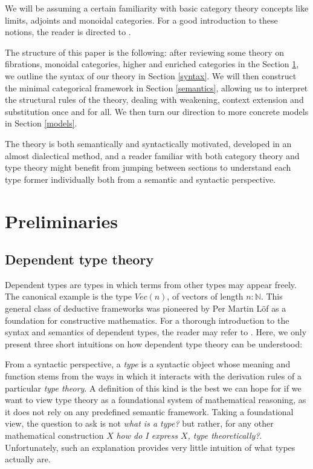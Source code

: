 We will be assuming a certain familiarity with basic category theory concepts like limits, adjoints and monoidal categories. For a good introduction to these notions, the reader is directed to \cite{awodey2010category}.

The structure of this paper is the following: after reviewing some theory on fibrations, monoidal categories, higher and enriched categories in the Section \ref{prelim}, we outline the syntax of our theory in Section \ref{syntax}. We will then construct the minimal categorical framework in Section \ref{semantics}, allowing us to interpret the structural rules of the theory, dealing with weakening, context extension and substitution once and for all. We then turn our direction to more concrete models in Section \ref{models}.

The theory is both semantically and syntactically motivated, developed in an almost dialectical method, and a reader familiar with both category theory and type theory might benefit from jumping between sections to understand each type former individually both from a semantic and syntactic perspective.
\section{Preliminaries}\label{prelim}
\subsection{Dependent type theory}
Dependent types are types in which terms from other types may appear freely. The canonical example is the type $Vec(n)$, of vectors of length $n : \mathbb{N}$. This general class of deductive frameworks was pioneered by Per Martin Löf \cite{martin1984intuitionistic} as a foundation for constructive mathematics. For a thorough introduction to the syntax and semantics of dependent types, the reader may refer to \cite{hofmann1997syntax}. Here, we only present three short intuitions on how dependent type theory can be understood:

From a syntactic perspective, a \textit{type} is a syntactic object whose meaning and function stems from the ways in which it interacts with the derivation rules of a particular \textit{type theory}. A definition of this kind is the best we can hope for if we want to view type theory as a foundational system of mathematical reasoning, as it does not rely on any predefined semantic framework. Taking a foundational view, the question to ask is not \textit{what is a type?} but rather, for any other mathematical construction $X$ \textit{how do I express $X$, type theoretically?}. Unfortunately, such an explanation provides very little intuition of what types actually are.

